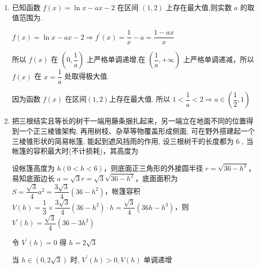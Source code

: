 \begin{enumerate}
    \item 已知函数 $f\left( x\right)  = \ln x - {ax} - 2$ 在区间 $\left( {1,2}\right)$ 上存在最大值,则实数 $a$ 的取值范围为.
    \begin{jieda}
        $f\left( x\right)  = \ln x - {ax} - 2 \Longrightarrow  {f}^{\prime }\left( x\right)  = \dfrac{1}{x} - a = \dfrac{1 - {ax}}{x}$
        所以 $f\left( x\right)$ 在 $\left( {0,\dfrac{1}{a}}\right)$ 上严格单调递增,在 $\left( {\dfrac{1}{a}, + \infty }\right)$ 上严格单调递减，所以 $f\left( x\right)$ 在 $x = \dfrac{1}{a}$ 处取得极大值.
        
        因为函数 $f\left( x\right)$ 在区间$(1,2)$上存在最大值. 所以 $1 < \dfrac{1}{a} < 2 \Longrightarrow  a \in  \left( {\dfrac{1}{2},1}\right)$ 
    \end{jieda}

    \item 把三根结实且等长的树干一端用藤条捆扎起来，另一端立在地面不同的位置得到一个正三棱锥架构, 再用树枝、杂草等物覆盖形成侧面, 可在野外搭建起一个三棱锥形状的简易帐篷, 能起到遮风挡雨的作用, 设三根树干的长度都为 6 , 当帐篷的容积最大时(不计损耗)，其高度为
    \begin{jieda}
        设帐篷高度为 $h\left( {0 < h < 6}\right)$，则底面正三角形的外接圆半径 $r = \sqrt{{36} - {h}^{2}}$，易知底面边长 $a = \sqrt{3}r = \sqrt{3}\sqrt{{36} - {h}^{2}}$，底面面积为 $S = \dfrac{\sqrt{3}}{4}{a}^{2} = \dfrac{3\sqrt{3}}{4}\left( {{36} - {h}^{2}}\right)$，帐篷容积 $V\left( h\right)  = \dfrac{1}{3} \times  \dfrac{3\sqrt{3}}{4}\left( {{36} - {h}^{2}}\right)  \cdot  h = \dfrac{\sqrt{3}}{4}\left( {{36h} - {h}^{3}}\right)$，则 ${V}^{\prime }\left( h\right)  = \dfrac{\sqrt{3}}{4}\left( {{36} - 3{h}^{2}}\right)$
        
        令 ${V}^{\prime }\left( h\right)  = 0$ 得 $h = 2\sqrt{3}$
        
        当 $h \in  \left( {0,2\sqrt{3}}\right)$ 时, ${V}^{\prime }\left( h\right)  > 0,V\left( h\right)$ 单调递增
        

\end{jieda}
\end{enumerate}
